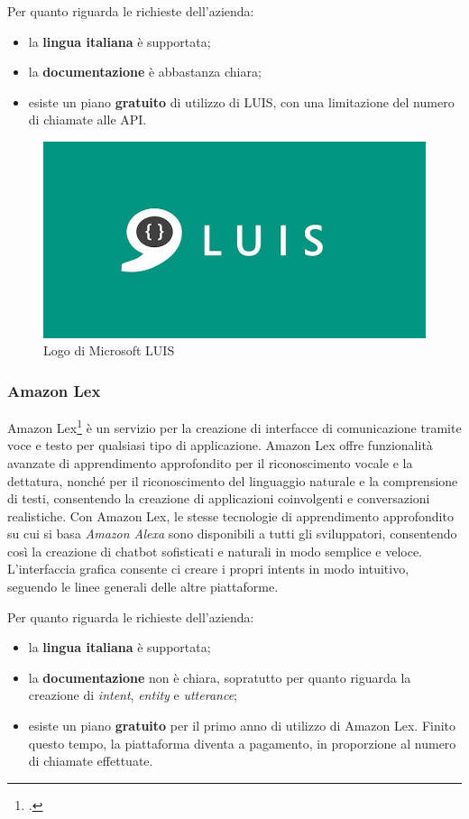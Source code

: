 Per quanto riguarda le richieste dell'azienda:
\begin{itemize}
	\item la \textbf{lingua italiana} è supportata;
	\item la \textbf{documentazione} è abbastanza chiara;
	\item esiste un piano \textbf{gratuito} di utilizzo di LUIS, con una limitazione del numero di chiamate alle API.
\end{itemize}

\begin{figure}[h]
	\centering
	\includegraphics[scale=0.25]{../Immagini/luis.jpg}
	\caption{Logo di Microsoft LUIS}
\end{figure}

\subsubsection{Amazon Lex}
Amazon Lex\footcite{lex} è un servizio per la creazione di interfacce di comunicazione tramite voce e testo per qualsiasi tipo di applicazione. Amazon Lex offre funzionalità avanzate di apprendimento approfondito per il riconoscimento vocale e la dettatura, nonché per il riconoscimento del linguaggio naturale e la comprensione di testi, consentendo la creazione di applicazioni coinvolgenti e conversazioni realistiche. Con Amazon Lex, le stesse tecnologie di apprendimento approfondito su cui si basa \emph{Amazon Alexa} sono disponibili a tutti gli sviluppatori, consentendo così la creazione di \gls{chatbot} sofisticati e naturali in modo semplice e veloce.\\
L'interfaccia grafica consente ci creare i propri intents in modo intuitivo, seguendo le linee generali delle altre piattaforme.

Per quanto riguarda le richieste dell'azienda:
\begin{itemize}
	\item la \textbf{lingua italiana} è supportata;
	\item la \textbf{documentazione} non è chiara, sopratutto per quanto riguarda la creazione di \emph{intent}, \emph{entity} e \emph{utterance};
	\item esiste un piano \textbf{gratuito} per il primo anno di utilizzo di Amazon Lex. Finito questo tempo, la piattaforma diventa a pagamento, in proporzione al numero di chiamate effettuate.
\end{itemize}

